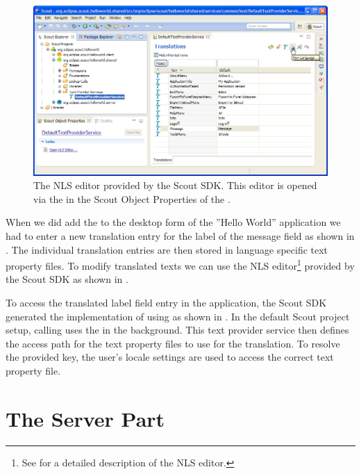 \documentclass[a4paper,10pt,twoside]{book}
\begin{document}
\begin{figure}
\includegraphics[width=14cm]{sdk_nls_editor.png} 
\caption{The NLS editor provided by the Scout SDK. This editor is opened via the  in the Scout Object Properties of the .
}
\end{figure}

When we did add the  to the desktop form of the ''Hello World'' application we had to enter a new translation entry for the label of the message field as shown in .
The individual translation entries are then stored in language specific text property files.
To modify translated texts we can use the NLS editor\footnote{
See  for a detailed description of the NLS editor.
} 
provided by the Scout SDK as shown in .

To access the translated label field entry in the application, the Scout SDK generated the implementation of  using  as shown in .
In the default Scout project setup, calling  uses the  in the background.
This text provider service then defines the access path for the text property files to use for the translation.
To resolve the provided key, the user's locale settings are used to access the correct text property file.

\section{The Server Part}
\end{document}
